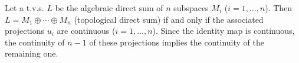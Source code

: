 Let a t.v.s. $L$ be the algebraic direct sum of $n$ subspaces $M_i$ ($i = 1, \ldots, n$). Then $L = M_1 \oplus \cdots \oplus M_n$ (topological direct sum) if and only if the associated projections $u_i$ are continuous ($i = 1, \ldots, n$). Since the identity map is continuous, the continuity of $n-1$ of these projections implies the continuity of the remaining one.
